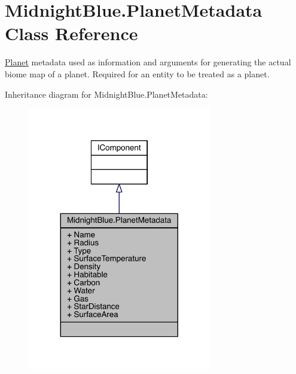 \hypertarget{class_midnight_blue_1_1_planet_metadata}{}\section{Midnight\+Blue.\+Planet\+Metadata Class Reference}
\label{class_midnight_blue_1_1_planet_metadata}


\hyperlink{class_midnight_blue_1_1_planet}{Planet} metadata used as information and arguments for generating the actual biome map of a planet. Required for an entity to be treated as a planet.  




Inheritance diagram for Midnight\+Blue.\+Planet\+Metadata\+:\nopagebreak
\begin{figure}[H]
\begin{center}
\leavevmode
\includegraphics[width=227pt]{class_midnight_blue_1_1_planet_metadata__inherit__graph}
\end{center}
\end{figure}


